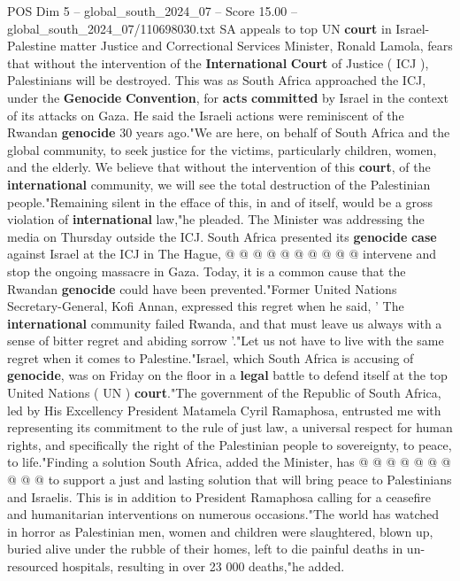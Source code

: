\begin{textsample}{POS Dim 5 – global\_south\_2024\_07 – Score 15.00 – global\_south\_2024\_07/110698030.txt}  \label{ex:f5_pos_180}
SA appeals to top UN \textbf{court} in Israel-Palestine matter Justice and Correctional Services Minister, Ronald Lamola, fears that without the intervention of the \textbf{International} \textbf{Court} of Justice ( ICJ ), Palestinians will be destroyed.
This was as South Africa approached the ICJ, under the \textbf{Genocide} \textbf{Convention}, for \textbf{acts} \textbf{committed} by Israel in the context of its attacks on Gaza.
He said the Israeli actions were reminiscent of the Rwandan \textbf{genocide} 30 years ago."We are here, on behalf of South Africa and the global community, to seek justice for the victims, particularly children, women, and the elderly.
We believe that without the intervention of this \textbf{court}, of the \textbf{international} community, we will see the total destruction of the Palestinian people."Remaining silent in the efface of this, in and of itself, would be a gross violation of \textbf{international} law,"he pleaded.
The Minister was addressing the media on Thursday outside the ICJ.
South Africa presented its \textbf{genocide} \textbf{case} against Israel at the ICJ in The Hague, @ @ @ @ @ @ @ @ @ @ intervene and stop the ongoing massacre in Gaza.
Today, it is a common cause that the Rwandan \textbf{genocide} could have been prevented."Former United Nations Secretary-General, Kofi Annan, expressed this regret when he said, ' The \textbf{international} community failed Rwanda, and that must leave us always with a sense of bitter regret and abiding sorrow '."Let us not have to live with the same regret when it comes to Palestine."Israel, which South Africa is accusing of \textbf{genocide}, was on Friday on the floor in a \textbf{legal} battle to defend itself at the top United Nations ( UN ) \textbf{court}."The government of the Republic of South Africa, led by His Excellency President Matamela Cyril Ramaphosa, entrusted me with representing its commitment to the rule of just law, a universal respect for human rights, and specifically the right of the Palestinian people to sovereignty, to peace, to life."Finding a solution South Africa, added the Minister, has @ @ @ @ @ @ @ @ @ @ to support a just and lasting solution that will bring peace to Palestinians and Israelis.
This is in addition to President Ramaphosa calling for a ceasefire and humanitarian interventions on numerous occasions."The world has watched in horror as Palestinian men, women and children were slaughtered, blown up, buried alive under the rubble of their homes, left to die painful deaths in un-resourced hospitals, resulting in over 23 000 deaths,"he added.

\end{textsample}
